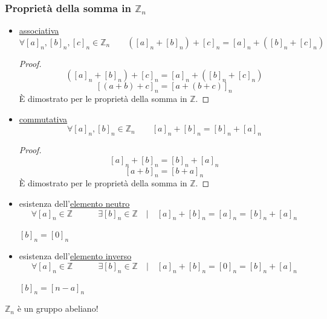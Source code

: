 \documentclass[a4paper,12pt, oneside]{book}
\begin{document}
			\subsubsection{Proprietà della somma in $\mathbb{Z}_n$}
				\begin{itemize}
					\item \underline{associativa}
						$$\forall [a]_n, [b]_n, [c]_n \in \mathbb{Z}_n \qquad ([a]_n+[b]_n)+[c]_n = [a]_n+([b]_n+[c]_n)$$
						\begin{proof}
							$$([a]_n+[b]_n)+[c]_n = [a]_n+([b]_n+[c]_n)$$
							$$[(a+b)+c]_n = [a+(b+c)]_n$$
							È dimostrato per le proprietà della somma in $\mathbb{Z}$.
						\end{proof}
					\item \underline{commutativa}
						$$\forall [a]_n, [b]_n \in \mathbb{Z}_n \qquad [a]_n+[b]_n = [b]_n+[a]_n$$
						\begin{proof}
							$$[a]_n+[b]_n = [b]_n+[a]_n$$
							$$[a+b]_n = [b+a]_n$$
							È dimostrato per le proprietà della somma in $\mathbb{Z}$.
						\end{proof}
					\item esistenza dell'\underline{elemento neutro}
						$$\forall [a]_n \in \mathbb{Z} \qquad\quad \exists [b]_n \in \mathbb{Z} \quad | \quad [a]_n+[b]_n=[a]_n=[b]_n+[a]_n$$
						\begin{nota}
							$[b]_n = [0]_n$
						\end{nota}
					\item esistenza dell'\underline{elemento inverso}
						$$\forall [a]_n \in \mathbb{Z} \qquad\quad \exists [b]_n \in \mathbb{Z} \quad | \quad [a]_n+[b]_n=[0]_n=[b]_n+[a]_n$$
						\begin{nota}
							$[b]_n = [n-a]_n$
						\end{nota}
				\end{itemize}
				\begin{nota}
					$\mathbb{Z}_n$ è un gruppo abeliano!
				\end{nota}
			
\end{document}
